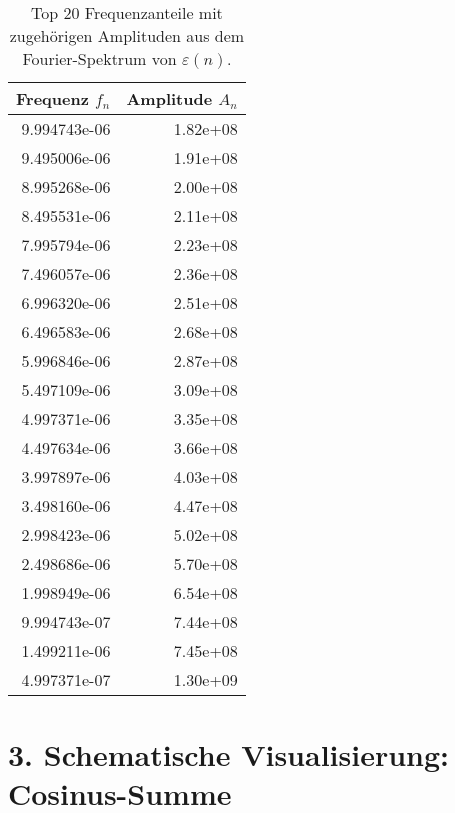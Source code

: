 \documentclass{article}
\begin{document}
\begin{table}[h!]
\centering
\begin{tabular}{@{}rr@{}}
\toprule
\textbf{Frequenz \( f_n \)} & \textbf{Amplitude \( A_n \)} \\
\midrule
9.994743e-06 & 1.82e+08 \\
9.495006e-06 & 1.91e+08 \\
8.995268e-06 & 2.00e+08 \\
8.495531e-06 & 2.11e+08 \\
7.995794e-06 & 2.23e+08 \\
7.496057e-06 & 2.36e+08 \\
6.996320e-06 & 2.51e+08 \\
6.496583e-06 & 2.68e+08 \\
5.996846e-06 & 2.87e+08 \\
5.497109e-06 & 3.09e+08 \\
4.997371e-06 & 3.35e+08 \\
4.497634e-06 & 3.66e+08 \\
3.997897e-06 & 4.03e+08 \\
3.498160e-06 & 4.47e+08 \\
2.998423e-06 & 5.02e+08 \\
2.498686e-06 & 5.70e+08 \\
1.998949e-06 & 6.54e+08 \\
9.994743e-07 & 7.44e+08 \\
1.499211e-06 & 7.45e+08 \\
4.997371e-07 & 1.30e+09 \\
\bottomrule
\end{tabular}
\caption{Top 20 Frequenzanteile mit zugehörigen Amplituden aus dem Fourier-Spektrum von \(\varepsilon(n)\).}
\end{table}

\section*{3. Schematische Visualisierung: Cosinus-Summe}
\end{document}

